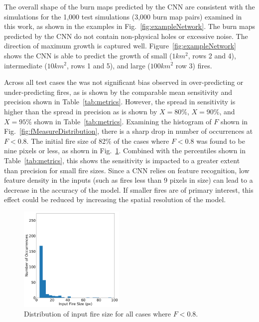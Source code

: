 \documentclass[smallcondensed]{svjour3}     %
\begin{document}
The overall shape of the burn maps predicted by the CNN are consistent
with the simulations for the 1,000 test simulations (3,000 burn map pairs)
examined in this work, as shown in the examples in Fig.~\ref{fig:exampleNetwork}.
The burn maps predicted by the CNN do not contain non-physical
holes or excessive noise. The direction of maximum growth is captured well.
Figure~\ref{fig:exampleNetwork} shows the CNN is able to predict the
growth of small ($1km^{2}$, rows 2 and 4), intermediate ($10km^{2}$, rows 1 and 5), and
large ($100km^{2}$ row 3) fires.

Across all test cases the was not significant bias
observed in over-predicting or under-predicting fires, as is shown by the
comparable mean sensitivity and precision shown in Table~\ref{tab:metrics}.
However, the spread in sensitivity is higher than the spread in precision
as is shown by $X=80\%$, $X=90\%$, and $X=95\%$ shown in Table~\ref{tab:metrics}.
Examining the histogram of $F$ shown in Fig.~\ref{fig:fMeasureDistribution},
there is a sharp drop in number of occurrences at $F < 0.8$.
The initial fire size of 82\% of the cases where $F < 0.8$ was found to be
nine pixels or less, as shown in Fig.~\ref{fig:fireSize}.
Combined with the percentiles shown in Table~\ref{tab:metrics}, this shows
the sensitivity is impacted to a greater extent than precision for small fire
sizes. Since a CNN relies on feature recognition, low feature density in
the inputs (such as fires less than 9 pixels in size) can lead to a decrease
in the accuracy of the model. If smaller fires are of primary interest,
this effect could be reduced by increasing the spatial resolution of the model.

\begin{figure}[htbp]
\centering
  \includegraphics[width=0.45\textwidth]{rothermelFull_cnnModel3_fireSize_when_F_lt_080.png}
\caption{Distribution of input fire size for all cases where $F < 0.8$.}
\label{fig:fireSize}       %
\end{figure}
\end{document}

